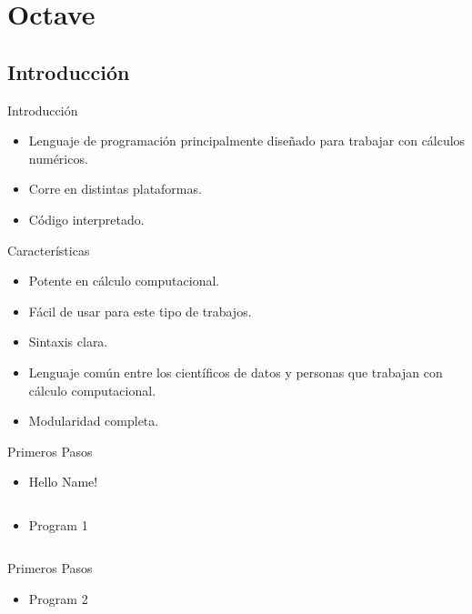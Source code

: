 \documentclass[usenames, dvipsnames, compress]{beamer}
\begin{document}
	\section{Octave}
	\subsection{Introducción}
	\begin{frame}{Introducción}
	\begin{itemize}[<+- | alert@ +>]
		\item Lenguaje de programación principalmente diseñado para trabajar con cálculos numéricos.
		\item Corre en distintas plataformas.
		\item Código interpretado.
	\end{itemize}
	\end{frame}
	\begin{frame}{Características}
	\begin{itemize}[<+- | alert@+>]
		\item Potente en cálculo computacional.
		\item Fácil de usar para este tipo de trabajos.
		\item Sintaxis clara.
		\item Lenguaje común entre los científicos de datos y personas que trabajan con cálculo computacional.
		\item Modularidad completa.
	\end{itemize}
	\end{frame}
	\begin{frame}{Primeros Pasos}
		\begin{itemize}
			\item [] \begin{block}{Hello Name!}
			\inputminted[xleftmargin=\parindent,linenos]{octave}{codes/hello.m}
		\end{block}
		\pause
		\item [] \begin{block}{Program 1}
			\inputminted[xleftmargin=\parindent,linenos]{python}{codes/program1.m}
			\end{block}
		\end{itemize}
	\end{frame}
	\begin{frame}{Primeros Pasos}
		\begin{itemize}
			\item []
			\begin{block}{Program 2}
				\inputminted[xleftmargin=\parindent,linenos]{python}{codes/program2.m}
			\end{block}
		\end{itemize}
	\end{frame}
\end{document}
